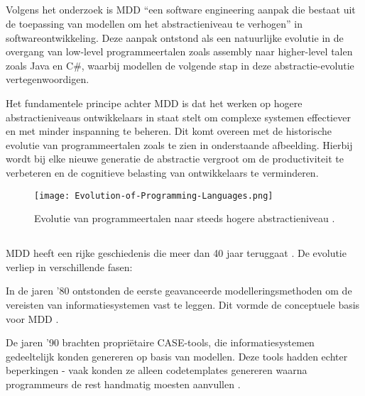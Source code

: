\subsection{}%

Volgens het onderzoek \textcite{Hailpern2006} is \gls{MDD} “een software engineering aanpak die bestaat uit de toepassing van modellen om het abstractieniveau te verhogen” in softwareontwikkeling. Deze aanpak ontstond als een natuurlijke evolutie in de overgang van low-level programmeertalen zoals assembly naar higher-level talen zoals Java en C\#, waarbij modellen de volgende stap in deze abstractie-evolutie vertegenwoordigen.

Het fundamentele principe achter \gls{MDD} is dat het werken op hogere abstractieniveaus ontwikkelaars in staat stelt om complexe systemen effectiever en met minder inspanning te beheren. Dit komt overeen met de historische evolutie van programmeertalen zoals te zien in onderstaande afbeelding. Hierbij wordt bij elke nieuwe generatie de abstractie vergroot om de productiviteit te verbeteren en de cognitieve belasting van ontwikkelaars te verminderen.

\begin{figure}[H]
    \centering
    \texttt{[image: Evolution-of-Programming-Languages.png]}
    \caption[Evolution of programming]{\label{fig:evolution} Evolutie van programmeertalen naar steeds hogere abstractieniveau \autocite{Vanderkooy2021}.}
\end{figure}


\subsection{}%
\gls{MDD} heeft een rijke geschiedenis die meer dan 40 jaar teruggaat \autocite{Henkel2010}. De evolutie verliep in verschillende fasen:

In de jaren '80 ontstonden de eerste geavanceerde modelleringsmethoden om de vereisten van informatiesystemen vast te leggen. Dit vormde de conceptuele basis voor \gls{MDD} \autocite{Henkel2010}.

De jaren '90 brachten propriëtaire \gls{CASE}-tools, die informatiesystemen gedeeltelijk konden genereren op basis van modellen. Deze tools hadden echter beperkingen - vaak konden ze alleen codetemplates genereren waarna programmeurs de rest handmatig moesten aanvullen \autocite{Case_1985}.

